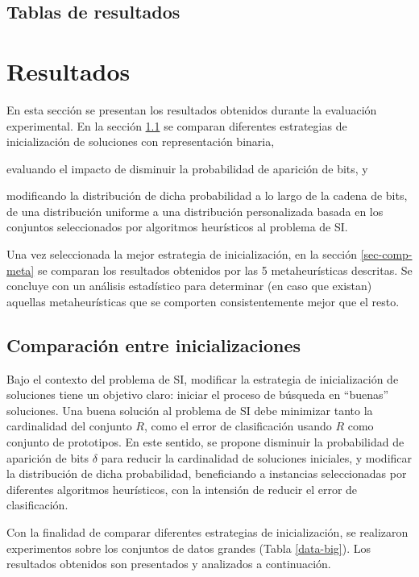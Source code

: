 \subsection{Tablas de resultados}

\section{Resultados}

En esta sección se presentan los resultados obtenidos durante la evaluación experimental. En la sección \ref{sec-comp-inits} se comparan diferentes estrategias de inicialización de soluciones con representación binaria,
\begin{inparaenum}
\item evaluando el impacto de disminuir la probabilidad de aparición de bits, y
\item modificando la distribución de dicha probabilidad a lo largo de la cadena de bits, de una distribución uniforme a una distribución personalizada basada en los conjuntos seleccionados por algoritmos heurísticos al problema de SI.
\end{inparaenum}
Una vez seleccionada la mejor estrategia de inicialización, en la sección \ref{sec-comp-meta} se comparan los resultados obtenidos por las 5 metaheurísticas descritas. Se concluye con un análisis estadístico para determinar (en caso que existan) aquellas metaheurísticas que se comporten consistentemente mejor que el resto.

\subsection{Comparación entre inicializaciones}
\label{sec-comp-inits}

Bajo el contexto del problema de SI, modificar la estrategia de inicialización de soluciones tiene un objetivo claro: iniciar el proceso de búsqueda en ``buenas'' soluciones. Una buena solución al problema de SI debe minimizar tanto la cardinalidad del conjunto $R$, como el error de clasificación usando $R$ como conjunto de prototipos. En este sentido, se propone disminuir la probabilidad de aparición de bits $\delta$ para reducir la cardinalidad de soluciones iniciales, y modificar la distribución de dicha probabilidad, beneficiando a instancias seleccionadas por diferentes algoritmos heurísticos, con la intensión de reducir el error de clasificación.

Con la finalidad de comparar diferentes estrategias de inicialización, se realizaron experimentos sobre los conjuntos de datos grandes (Tabla \ref{data-big}). Los resultados obtenidos son presentados y analizados a continuación.

